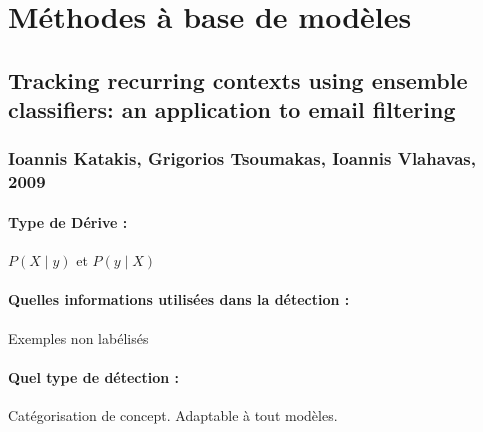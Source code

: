 \documentclass[11pt,a4paper]{report}
\begin{document}



















\newpage












\section{Méthodes à base de modèles}
\subsection{Tracking recurring contexts using ensemble classifiers: an application to email filtering}
\subsubsection{Ioannis Katakis, Grigorios Tsoumakas, Ioannis Vlahavas, 2009}

\paragraph{Type de Dérive :} $P(X\mid y)$ et $P(y \mid X)$
\paragraph{Quelles informations utilisées dans la détection :} Exemples non labélisés
\paragraph{Quel type de détection :} Catégorisation de concept. Adaptable à tout modèles.
\end{document}
